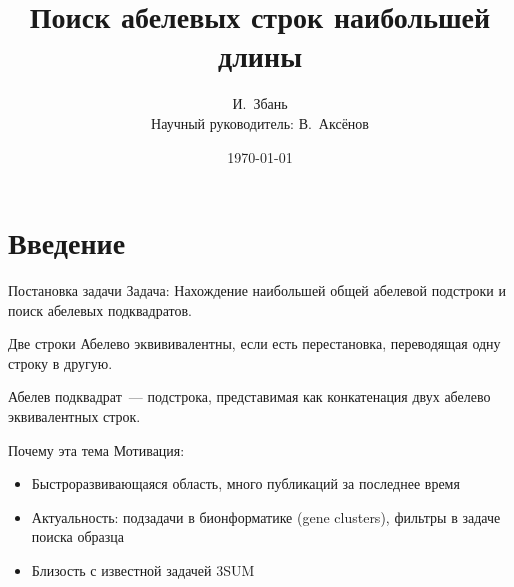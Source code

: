 \documentclass[hyperref=unicode,graphics=pdflatex,12pt]{beamer}
\begin{document}
\title{Поиск абелевых строк наибольшей длины}
\author{И.~Збань\\
Научный руководитель: В.~Аксёнов}

\date{\today}
\frame{\titlepage}                                   

\section{Введение}

\begin{frame}{Постановка задачи}
\hspace{0.5cm}
Задача: Нахождение наибольшей общей абелевой подстроки и поиск абелевых подквадратов.

\vspace{0.5cm}
\hspace{0.5cm}
Две строки Абелево эквививалентны, если есть перестановка, переводящая одну строку в другую.

\vspace{0.5cm}
\hspace{0.5cm}
Абелев подквадрат~--- подстрока, представимая как конкатенация двух абелево эквивалентных строк.


\end{frame}


\begin{frame}{Почему эта тема}
\hspace{0.5cm}
\alert{Мотивация:}
\begin{itemize}
\item<2-> Быстроразвивающаяся область, много публикаций за последнее время
\item<3-> Актуальность: подзадачи в бионформатике (gene clusters), фильтры в задаче поиска образца
\item<4-> Близость с известной задачей 3SUM
\end{itemize}
\end{frame}
\end{document}
